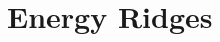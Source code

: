 \section{Energy Ridges}

\placeholder


\begin{comment}
--- Anything below here is a direct copy from either the \latex file of the manuscript or the online version of the article ---

\section{\label{sec:results-adatom}Application: Al adatom diffusion on an Al(100) surface}

An Al adatom on the Al(100) surface provides an interesting system to study because several different diffusion mechanisms have been found, including various concerted displacements of two or more atoms, in addition to the, more intuitive, hop mechanism~\cite{concerted-motion-1990, dimer-original-1999, johannessson-01}.
An embedded atom method potential (EAM)~\cite{eam-1986} is used here since it has been shown to accurately describe the system and requires much less computational effort than DFT calculations.
The simulated cell was a slab of 6 layers, each of which was $8\times8$ atoms, with one adatom, totalling 385 atoms.
The two bottom layers were kept fixed at bulk positions with a lattice parameter of $4.038\unit{\mAA}$.
Initially, traditional NEB calculations were carried out to find the relevant \sap{1}s which were then used as end points in the ridge calculations.
The spring constant was set at $k = 5.0\unit{eV/\mAA}$.
The two images in the dimer had a fixed separation of $0.0001\unit{\mAA}$ and were allowed to rotate only once for each iteration in the path optimisation.
The initial minimum mode guesses were taken from a Gaussian distribution.
The convergence criteria for the maximum effective force component were set at $0.01\unit{eV/\mAA}$ and $0.001\unit{eV/\mAA}$ for the regular and climbing image calculations respectively.

\begin{figure}[t]
\begin{center}
\texttt{[image: figures/low-barriers]}
\caption{
The energy ridge going through \sap{1}s of 2-atom, 3-atom, 4-atom and, then the same, 2-atom concerted displacement for an Al adatom on a Al(100) surface.
The circles represent the position of images in the optimised paths, the \sap{1}s and the \sap{2}s being coloured differently but the rest coloured grey.
The green curves represent harmonic approximations to the energy surface at each \sap{1}.
The insets show an overlay of three configurations, two adjacent \sap{1}s and the intermediate \sap{2}.
The atom colours correspond to the coloured spheres of the energy ridge.
The \sap{2}s adjacent to the 3-atom and 4-atom concerted displacements are low and the harmonic approximation to TST is less accurate for these mechanisms than the 2-atom concerted displacement.
}
\label{fig:low-barriers}
\end{center}
\end{figure}


\end{comment}
